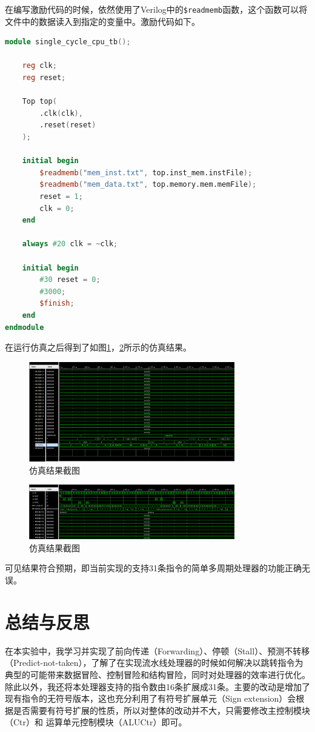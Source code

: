 在编写激励代码的时候，依然使用了Verilog中的\texttt{\$readmemb}函数，这个函数可以将文件中的数据读入到指定的变量中。激励代码如下。

\begin{lstlisting}[language=Verilog]
module single_cycle_cpu_tb();

    reg clk;
    reg reset;

    Top top(
        .clk(clk),
        .reset(reset)
    );

    initial begin
        $readmemb("mem_inst.txt", top.inst_mem.instFile);
        $readmemb("mem_data.txt", top.memory.mem.memFile);
        reset = 1;
        clk = 0;
    end

    always #20 clk = ~clk;

    initial begin
        #30 reset = 0;
        #3000;
        $finish;
    end
endmodule
\end{lstlisting}

在运行仿真之后得到了如图\ref{result1}，\ref{result2}所示的仿真结果。
\begin{figure}[!h]
    \centering
    \includegraphics[width=0.8\textwidth]{./result1.png}
    \caption{仿真结果截图}
    \label{result1}
\end{figure}

\begin{figure}[!h]
    \centering
    \includegraphics[width=0.8\textwidth]{./result2.png}
    \caption{仿真结果截图}
    \label{result2}
\end{figure}

可见结果符合预期，即当前实现的支持31条指令的简单多周期处理器的功能正确无误。

\section{总结与反思}
在本实验中，我学习并实现了前向传递（Forwarding）、停顿（Stall）、预测不转移（Predict-not-taken），了解了在实现流水线处理器的时候如何解决以跳转指令为典型的可能带来数据冒险、控制冒险和结构冒险，同时对处理器的效率进行优化。
除此以外，我还将本处理器支持的指令数由16条扩展成31条。主要的改动是增加了现有指令的无符号版本，这也充分利用了有符号扩展单元（Sign extension）会根据是否需要有符号扩展的性质，所以对整体的改动并不大，只需要修改主控制模块（Ctr）和
运算单元控制模块（ALUCtr）即可。

